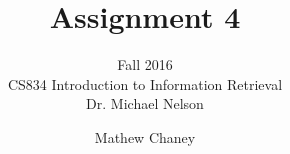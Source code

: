 \documentclass[10pt,letterpaper,bibliography=totocnumbered]{scrartcl}
\begin{document}
\author{Mathew Chaney}
\title{Assignment 4}
\subtitle{Fall 2016\\ CS834 Introduction to Information Retrieval\\ Dr. Michael Nelson}
\maketitle
\newpage

\tableofcontents
\lstlistoflistings
\listoffigures
\listoftables









\end{document}
